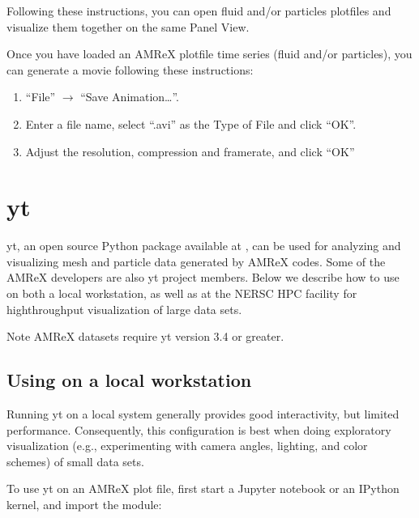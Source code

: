 \documentclass[letterpaper,10pt,english]{sphinxmanual}
\begin{document}
\sphinxAtStartPar
Following these instructions, you can open fluid and/or particles plotfiles and visualize them together on the same Panel View.

\sphinxAtStartPar
Once you have loaded an AMReX plotfile time series (fluid and/or particles), you can generate a movie following these instructions:
\begin{enumerate}
%
\item {} 
\sphinxAtStartPar
“File” \(\rightarrow\) “Save Animation…”.

\item {} 
\sphinxAtStartPar
Enter a file name, select “.avi” as the Type of File and click “OK”.

\item {} 
\sphinxAtStartPar
Adjust the resolution, compression and framerate, and click “OK”

\end{enumerate}


\section{yt}
\label{\detokenize{Visualization:yt}}\label{\detokenize{Visualization:section-2}}
\sphinxAtStartPar
yt, an open source Python package available at , can be
used for analyzing and visualizing mesh and particle data generated by
AMReX codes. Some of the AMReX developers are also yt project members.  Below
we describe how to use on both a local workstation, as well as at the NERSC
HPC facility for high\sphinxhyphen{}throughput visualization of large data sets.

\sphinxAtStartPar
Note \sphinxhyphen{} AMReX datasets require yt version 3.4 or greater.


\subsection{Using on a local workstation}
\label{\detokenize{Visualization:using-on-a-local-workstation}}
\sphinxAtStartPar
Running yt on a local system generally provides good interactivity, but limited
performance. Consequently, this configuration is best when doing exploratory
visualization (e.g., experimenting with camera angles, lighting, and color
schemes) of small data sets.

\sphinxAtStartPar
To use yt on an AMReX plot file, first start a Jupyter notebook or an IPython
kernel, and import the  module:
\end{document}
